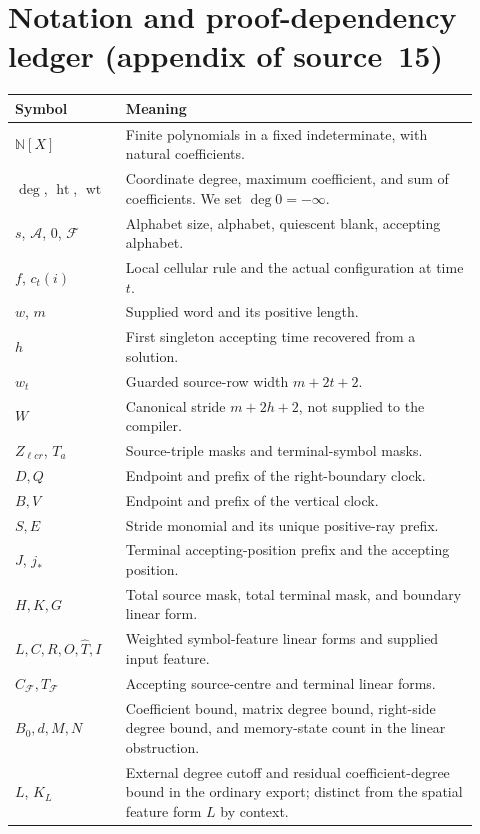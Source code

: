 \documentclass[11pt,letterpaper]{article}
\numberwithin{equation}{section}
\theoremstyle{definition}
\newcommand{\N}{\mathbb N}
\newcommand{\A}{\mathcal A}
\newcommand{\F}{\mathcal F}
\newcommand{\wt}{\operatorname{wt}}
\newcommand{\htc}{\operatorname{ht}}
\newcommand{\CF}{C_{\F}}
\newcommand{\TF}{T_{\F}}
\begin{document}
\clearpage
\section{Notation and proof-dependency ledger (appendix of source~15)}\label{pwh:oc:app:ledger}

\begin{longtable}{@{}P{0.22\linewidth}P{0.70\linewidth}@{}}
\toprule
Symbol & Meaning\\
\midrule
\endhead
$\N[X]$ & Finite polynomials in a fixed indeterminate, with natural coefficients.\\
$\deg$, $\htc$, $\wt$ & Coordinate degree, maximum coefficient, and sum of coefficients. We set $\deg0=-\infty$.\\
$s$, $\A$, $0$, $\F$ & Alphabet size, alphabet, quiescent blank, accepting alphabet.\\
$f$, $c_t(i)$ & Local cellular rule and the actual configuration at time $t$.\\
$w$, $m$ & Supplied word and its positive length.\\
$h$ & First singleton accepting time recovered from a solution.\\
$w_t$ & Guarded source-row width $m+2t+2$.\\
$W$ & Canonical stride $m+2h+2$, not supplied to the compiler.\\
$Z_{\ell cr}$, $T_a$ & Source-triple masks and terminal-symbol masks.\\
$D,Q$ & Endpoint and prefix of the right-boundary clock.\\
$B,V$ & Endpoint and prefix of the vertical clock.\\
$S,E$ & Stride monomial and its unique positive-ray prefix.\\
$J$, $j_*$ & Terminal accepting-position prefix and the accepting position.\\
$H,K,G$ & Total source mask, total terminal mask, and boundary linear form.\\
$L,C,R,O,\widehat T,I$ & Weighted symbol-feature linear forms and supplied input feature.\\
$\CF,\TF$ & Accepting source-centre and terminal linear forms.\\
$B_0,d,M,N$ & Coefficient bound, matrix degree bound, right-side degree bound, and memory-state count in the linear obstruction.\\
$L$, $K_L$ & External degree cutoff and residual coefficient-degree bound in the ordinary export; distinct from the spatial feature form $L$ by context.\\
\bottomrule
\end{longtable}
\end{document}
